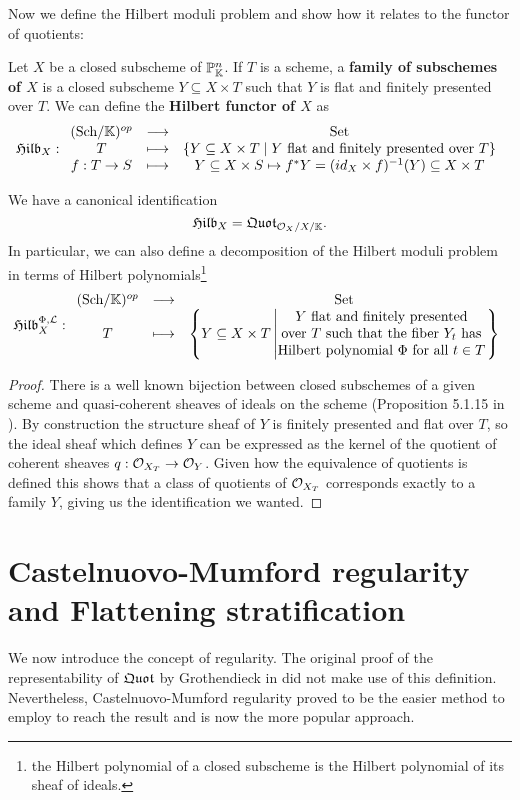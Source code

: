 Now we define the Hilbert moduli problem and show how it relates to the functor of quotients:

\begin{definition}
Let $X$ be a closed subscheme of $\mathbb{P}^n_{\mathbb{K}}$.
If $T$ is a scheme, a \textbf{family of subschemes of $X$} is a closed subscheme $Y\subseteq X\times T$ such that $Y$ is flat and finitely presented over $T$. 
We can define the \textbf{Hilbert functor of $X$} as
\[\mathfrak{Hilb}_{X}:\begin{array}{ccc} {({\mathrm{Sch}}/{\mathbb{K}})^{op}} & \longrightarrow & {\mathrm{Set}}\\ {T} & \longmapsto & {\left\{{Y\subseteq X\times T\mid Y\text{ flat and finitely presented over }T}\right\}}\\ {f:T\to S} & \longmapsto & {Y\subseteq X\times S\mapsto f^\ast Y=(id_{X}\times f)^{-1}(Y)\subseteq X\times T} \end{array}\]
\end{definition}

\begin{proposition}\label{HilbertIsAQuotScheme}
We have a canonical identification
\[\mathfrak{Hilb}_X=\mathfrak{Quot}_{\mathcal{O}_X/X/\mathbb{K}}.\]
In particular, we can also define a decomposition of the Hilbert moduli problem in terms of Hilbert polynomials\footnote{the Hilbert polynomial of a closed subscheme is the Hilbert polynomial of its sheaf of ideals.}
\[\mathfrak{Hilb}^{\Phi,\mathcal{L}}_{X}:\begin{array}{ccc} {({\mathrm{Sch}}/{\mathbb{K}})^{op}} & \longrightarrow & {\mathrm{Set}}\\ {T} & \longmapsto & {\left\{{Y\subseteq X\times T\left| \begin{matrix}Y\text{ flat and finitely presented}\\\text{over $T$ such that the fiber $Y_t$ has}\\\text{Hilbert polynomial $\Phi$ for all $t\in T$}\end{matrix}\right.}\right\}} \end{array}\]
\end{proposition}
\begin{proof}
There is a well known bijection between closed subschemes of a given scheme and quasi-coherent sheaves of ideals on the scheme (Proposition 5.1.15 in \cite{QingLiu}). By construction the structure sheaf of $Y$ is finitely presented and flat over $T$, so the ideal sheaf which defines $Y$ can be expressed as the kernel of the quotient of coherent sheaves $q:\mathcal{O}_{X_T}\to \mathcal{O}_Y$. Given how the equivalence of quotients is defined this shows that a class of quotients of $\mathcal{O}_{X_T}$ corresponds exactly to a family $Y$, giving us the identification we wanted.
\end{proof}

\section{Castelnuovo-Mumford regularity and Flattening stratification}

We now introduce the concept of regularity. The original proof of the representability of $\mathfrak{Quot}$ by Grothendieck in \cite{FGAVI} did not make use of this definition. Nevertheless, Castelnuovo-Mumford regularity proved to be the easier method to employ to reach the result and is now the more popular approach.

